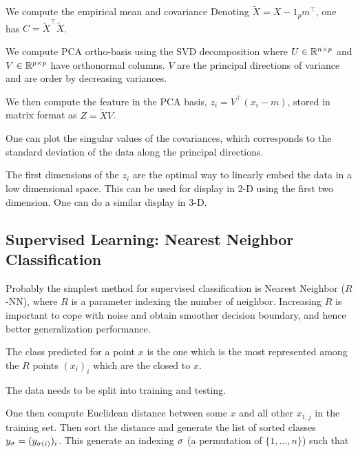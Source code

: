 We compute the empirical mean
and  covariance
Denoting $\tilde X = X - 1_p m^\top $, one has $C=\tilde X^\top
\tilde X$. 



We compute PCA ortho-basis using the SVD decomposition
where $U \in \mathbb{R}^{n \times p}$ and $V \in \mathbb{R}^{p \times p}$ have
orthonormal columns. $V$ are the principal directions of variance and
are order by decreasing variances. 

We then compute the feature in the PCA basis, $z_i=V^\top (x_i-m) $, stored in matrix format as $Z=\tilde X V$.


One can plot the singular values of the covariances, which corresponds to the standard deviation of the data 
along the principal directions.



The first dimensions of the $z_i$ are the optimal way to linearly
embed the data in a low dimensional space. 
This can be used for display in 2-D using the first two dimension.
One can do a similar display in 3-D.



\subsection{Supervised Learning: Nearest Neighbor Classification}

Probably the simplest method for supervised classification is Nearest
Neighbor ($R$-NN), where $R$ is a parameter indexing the number of neighbor.
Increasing $R$ is important to cope with noise and obtain smoother
decision boundary, and hence better generalization performance.

The class predicted for a point $x$ is the one which is the most
represented among the $R$ points $(x_i)_i$ which are the closed to
$x$.


The data needs to be split into training and testing.

One then compute Euclidean distance between some $x$ 
and all other $x_{1,j}$ in the training set. 
%
Then sort the distance and generate the list of sorted classes $ y_\sigma = (y_{\sigma(i)})_i$. This
generate an indexing $\sigma$ (a permutation of $\{1,\ldots,n\}$) such that 


